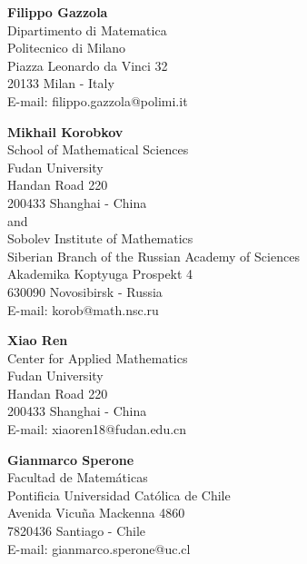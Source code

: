 \documentclass[11pt]{article}
\numberwithin{equation}{section}
\numberwithin{figure}{section}
\begin{document}
\small{
\noindent
\hspace{0.1mm}
\begin{minipage}{140mm}
	\textbf{Filippo Gazzola}\\
	Dipartimento di Matematica\\
	Politecnico di Milano\\
	Piazza Leonardo da Vinci 32\\
	20133 Milan - Italy\\
	E-mail: filippo.gazzola@polimi.it
\vspace{0.5cm}	
\end{minipage}
\newline
\vspace{0.5cm}
\noindent
\begin{minipage}{100mm}
	\textbf{Mikhail Korobkov}\\
	School of Mathematical Sciences\\
	Fudan University\\
	Handan Road 220\\
	200433 Shanghai - China\\
	and\\
	Sobolev Institute of Mathematics\\
	Siberian Branch of the Russian Academy of Sciences\\
	Akademika Koptyuga Prospekt 4\\
	630090 Novosibirsk - Russia\\
	E-mail: korob@math.nsc.ru
\end{minipage}
\newline
\vspace{0.5cm}
\begin{minipage}{100mm}
	\textbf{Xiao Ren}\\
	Center for Applied Mathematics\\
Fudan University\\
Handan Road 220\\
	200433 Shanghai - China\\
	E-mail: xiaoren18@fudan.edu.cn
\end{minipage}
\newline
\vspace{0.5cm}
\begin{minipage}{100mm}
		\textbf{Gianmarco Sperone}\\
		Facultad de Matemáticas\\
		Pontificia Universidad Católica de Chile\\
		Avenida Vicuña Mackenna 4860\\
		7820436 Santiago - Chile\\
		E-mail: gianmarco.sperone@uc.cl
\end{minipage}
}	
\end{document}
